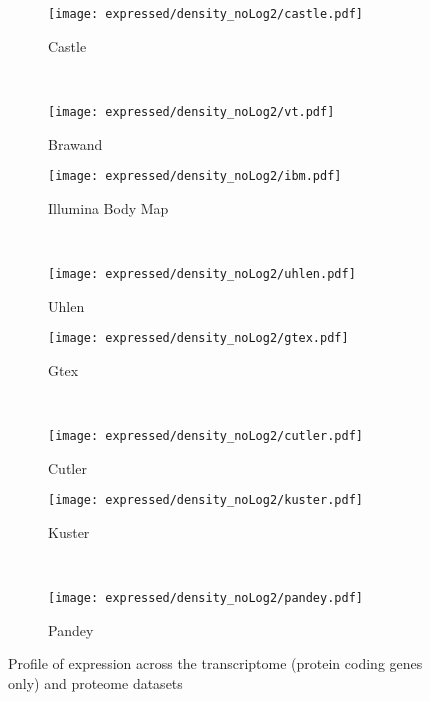 \begin{figure}[!ht]
    \centering
    \begin{subfigure}[b]{0.35\textwidth}
        \centering \texttt{[image: expressed/density\_noLog2/castle.pdf]}
        \caption{Castle}\label{fig:densityCastle_nolog2}
    \end{subfigure}%
~%
    \begin{subfigure}[b]{0.35\textwidth}
        \centering \texttt{[image: expressed/density\_noLog2/vt.pdf]}
        \caption{Brawand}\label{fig:densityBrawand_nolog2}
    \end{subfigure}

    \begin{subfigure}[b]{0.35\textwidth}
        \centering \texttt{[image: expressed/density\_noLog2/ibm.pdf]}
        \caption{Illumina Body Map}\label{fig:densityIBM_nolog2}
    \end{subfigure}%
~%
    \begin{subfigure}[b]{0.35\textwidth}
        \centering \texttt{[image: expressed/density\_noLog2/uhlen.pdf]}
        \caption{Uhlen}\label{fig:densityUhlen_nolog2}
    \end{subfigure}

    \begin{subfigure}[b]{0.35\textwidth}
        \centering \texttt{[image: expressed/density\_noLog2/gtex.pdf]}
        \caption{Gtex}\label{fig:densityGtex_nolog2}
    \end{subfigure}%
~%
    \begin{subfigure}[b]{0.35\textwidth}
        \centering \texttt{[image: expressed/density\_noLog2/cutler.pdf]}
        \caption{Cutler}\label{fig:densityCutler_nolog2}
    \end{subfigure}

    \begin{subfigure}[b]{0.35\textwidth}
        \centering \texttt{[image: expressed/density\_noLog2/kuster.pdf]}
        \caption{Kuster}\label{fig:densityKuster_nolog2}
    \end{subfigure}%
~%
    \begin{subfigure}[b]{0.35\textwidth}
        \centering \texttt{[image: expressed/density\_noLog2/pandey.pdf]}
        \caption{Pandey}\label{fig:densityPandey_nolog2}
    \end{subfigure}
    \caption{Profile of expression across the transcriptome (protein coding
    genes only) and proteome datasets}\label{fig:distribPlot_noLog2}
\end{figure}


